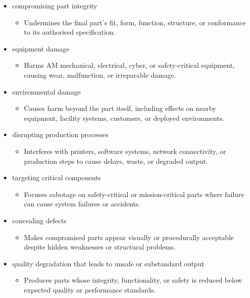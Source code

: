 \documentclass[10pt,a4paper,oneside]{report}
\begin{document}
\begin{itemize}
\begin{itemize}
\item Introduces unwanted material, foreign objects, or NBC contamination into feedstock, equipment, or parts.
\end{itemize}
\item compromising part integrity
\begin{itemize}
\item Undermines the final part's fit, form, function, structure, or conformance to its authorised specification.
\end{itemize}
\item equipment damage
\begin{itemize}
\item Harms AM mechanical, electrical, cyber, or safety-critical equipment, causing wear, malfunction, or irreparable damage.
\end{itemize}
\item environmental damage
\begin{itemize}
\item Causes harm beyond the part itself, including effects on nearby equipment, facility systems, customers, or deployed environments.
\end{itemize}
\item disrupting production processes
\begin{itemize}
\item Interferes with printers, software systems, network connectivity, or production steps to cause delays, waste, or degraded output.
\end{itemize}
\item targeting critical components
\begin{itemize}
\item Focuses sabotage on safety-critical or mission-critical parts where failure can cause system failures or accidents.
\end{itemize}
\item concealing defects
\begin{itemize}
\item Makes compromised parts appear visually or procedurally acceptable despite hidden weaknesses or structural problems.
\end{itemize}
\item quality degradation that leads to unsafe or substandard output
\begin{itemize}
\item Produces parts whose integrity, functionality, or safety is reduced below expected quality or performance standards.
\end{itemize}
\end{itemize}
\end{document}
